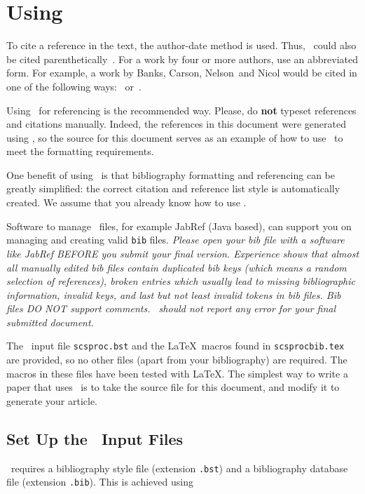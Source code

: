 \documentclass{scspaperproc}
\theoremstyle{scsthe}
\begin{document}
\section{Using \BibTeX}
\label{sec:bibtex}
To cite a reference in the text, the author-date method is used. Thus,~ could also be cited parenthetically~\cite{chi89}. For a work by four or more authors, use an abbreviated form. For example, a work by Banks, Carson, Nelson~and Nicol would be cited in one of the following ways:~ or~.

Using \BibTeX\ for referencing is the recommended way. Please, do \textbf{not} typeset references and citations manually. Indeed, the references in this document were generated using \BibTeX, so the source for this document serves as an example of how to use \BibTeX\ to meet the formatting requirements.

One benefit of using \BibTeX\ is that bibliography formatting and referencing can be greatly simplified: the correct citation and reference list style is automatically created. We assume that you already know how to use \BibTeX.

Software to manage \BibTeX\ files, for example JabRef (Java based), can support you on managing and creating valid \texttt{bib} files.
\emph{Please open your bib file with a software like JabRef BEFORE you submit your final version. Experience shows that almost all manually edited bib files contain duplicated bib keys (which means a random selection of references), broken entries which usually lead to missing bibliographic information, invalid keys, and last but not least invalid tokens in bib files. Bib files DO NOT support comments. \BibTeX\ should not report any error for your final submitted document.}

The \BibTeX\ input file \texttt{scsproc.bst} and the \LaTeX\ macros found in \texttt{scsprocbib.tex} are provided, so no other files (apart from your bibliography) are required. The macros in these files have been tested with \LaTeX. The simplest way to write a paper that uses \BibTeX\ is to take the source file for this document, and modify it to generate your article.

\subsection{Set Up the \BibTeX\ Input Files}

\BibTeX\ requires a bibliography style file (extension \texttt{.bst}) and a bibliography database file (extension \texttt{.bib}).  This is achieved using
\end{document}
